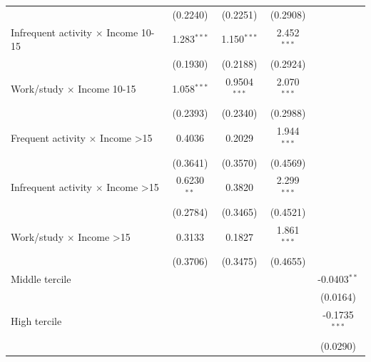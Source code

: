 \begin{table}[htbp]
\begin{tabular}{lcccc}
                                                   & (0.2240)              & (0.2251)             & (0.2908)             &   \\   
      Infrequent activity $\times$ Income 10-15    & 1.283$^{***}$         & 1.150$^{***}$        & 2.452$^{***}$        &   \\   
                                                   & (0.1930)              & (0.2188)             & (0.2924)             &   \\   
      Work/study $\times$ Income 10-15             & 1.058$^{***}$         & 0.9504$^{***}$       & 2.070$^{***}$        &   \\   
                                                   & (0.2393)              & (0.2340)             & (0.2988)             &   \\   
      Frequent activity $\times$ Income >15        & 0.4036                & 0.2029               & 1.944$^{***}$        &   \\   
                                                   & (0.3641)              & (0.3570)             & (0.4569)             &   \\   
      Infrequent activity $\times$ Income >15      & 0.6230$^{**}$         & 0.3820               & 2.299$^{***}$        &   \\   
                                                   & (0.2784)              & (0.3465)             & (0.4521)             &   \\   
      Work/study $\times$ Income >15               & 0.3133                & 0.1827               & 1.861$^{***}$        &   \\   
                                                   & (0.3706)              & (0.3475)             & (0.4655)             &   \\   
      Middle tercile                               &                       &                      &                      & -0.0403$^{**}$\\   
                                                   &                       &                      &                      & (0.0164)\\   
      High tercile                                 &                       &                      &                      & -0.1735$^{***}$\\   
                                                   &                       &                      &                      & (0.0290)\\   

\end{tabular}
\end{table}
